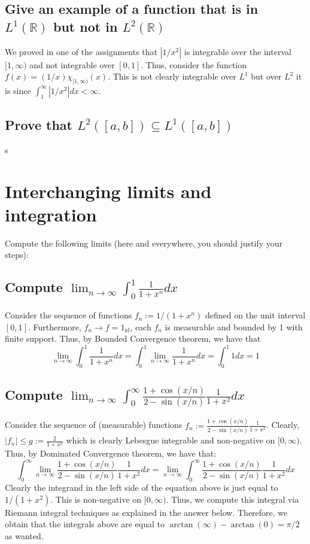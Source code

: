 \documentclass[11pt]{amsart}
\newcommand{\R}{\mathbb{R}}  %
\begin{document}
\subsection*{Give an example of a function that is in $L^1(\R)$ but not in $L^2(\R)$} We proved in one of the assignments that $|1/x^2|$ is integrable over the interval $[1,\infty)$
and not integrable over $[0,1]$. Thus, consider the function $f(x) = (1/x)\chi_{[1,\infty)}(x)$. This is not clearly integrable over $L^1$ but over $L^2$ it is since $\int_1^{\infty} |1/x^2|dx<\infty$.

\subsection*{Prove that $L^2([a,b])\subseteq  L^1([a,b])$} s

\section{Interchanging limits and integration}

Compute the following limits (here and everywhere, you should justify your steps):

\subsection*{Compute $\lim_{n\to\infty} \int_0^1 \frac{1}{1+x^n}dx$} Consider the sequence of functions $f_n := 1/(1+x^n)$ defined on the unit interval $[0,1]$. Furthermore,
$f_n\to f = 1_{\text{id}}$, each $f_n$ is measurable and bounded by 1 with finite support. Thus, by Bounded Convergence theorem, we have that
\[ \lim_{n\to\infty} \int_0^1 \frac{1}{1+x^n}dx = \int_0^1 \lim_{n\to\infty} \frac{1}{1+x^n}dx = \int_0^1 1dx = 1 \]

\subsection*{Compute $\lim_{n\to\infty} \int_0^{\infty} \frac{1+\cos(x/n)}{2-\sin(x/n)}\frac{1}{1+x^2}dx$} Consider the sequence of (measurable) 
functions $f_n := \frac{1+\cos(x/n)}{2-\sin(x/n)}\frac{1}{1+x^2}$. Clearly, $|f_n| \leq g := \frac{2}{1+x^2}$ which is clearly Lebesgue integrable and non-negative on $[0,\infty)$.
Thus, by Dominated Convergence theorem, we have that:
\[ \int_0^{\infty} \lim_{n\to\infty} \frac{1+\cos(x/n)}{2-\sin(x/n)}\frac{1}{1+x^2}dx = \lim_{n\to\infty} \int_0^{\infty} \frac{1+\cos(x/n)}{2-\sin(x/n)}\frac{1}{1+x^2}dx \]
Clearly the integrand in the left side of the equation above is just equal to $1/(1+x^2)$. This is non-negative on $[0,\infty)$. Thus, we compute this integral via Riemann integral
techniques as explained in the answer below. Therefore, we obtain that the integrals above are equal to $\arctan(\infty)-\arctan(0)=\pi/2$
as wanted.
\end{document}
